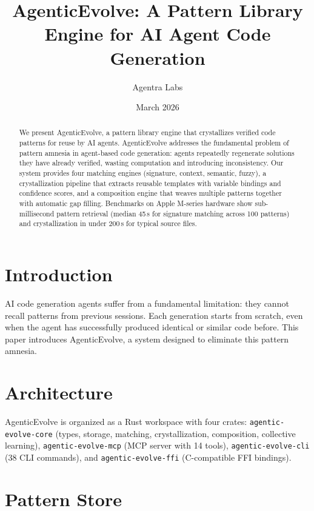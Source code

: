 \documentclass[11pt,a4paper]{article}
\title{AgenticEvolve: A Pattern Library Engine for AI Agent Code Generation}
\author{Agentra Labs}
\date{March 2026}
\begin{document}
\maketitle

\begin{abstract}
We present AgenticEvolve, a pattern library engine that crystallizes verified
code patterns for reuse by AI agents. AgenticEvolve addresses the fundamental
problem of pattern amnesia in agent-based code generation: agents repeatedly
regenerate solutions they have already verified, wasting computation and
introducing inconsistency. Our system provides four matching engines
(signature, context, semantic, fuzzy), a crystallization pipeline that
extracts reusable templates with variable bindings and confidence scores,
and a composition engine that weaves multiple patterns together with
automatic gap filling. Benchmarks on Apple M-series hardware show
sub-millisecond pattern retrieval (median 45\,\textmu{}s for signature
matching across 100 patterns) and crystallization in under 200\,\textmu{}s
for typical source files.
\end{abstract}

\section{Introduction}

AI code generation agents suffer from a fundamental limitation: they cannot
recall patterns from previous sessions. Each generation starts from scratch,
even when the agent has successfully produced identical or similar code before.
This paper introduces AgenticEvolve, a system designed to eliminate this
pattern amnesia.

\section{Architecture}

AgenticEvolve is organized as a Rust workspace with four crates:
\texttt{agentic-evolve-core} (types, storage, matching, crystallization,
composition, collective learning), \texttt{agentic-evolve-mcp} (MCP server
with 14 tools), \texttt{agentic-evolve-cli} (38 CLI commands), and
\texttt{agentic-evolve-ffi} (C-compatible FFI bindings).

\section{Pattern Store}
\end{document}
